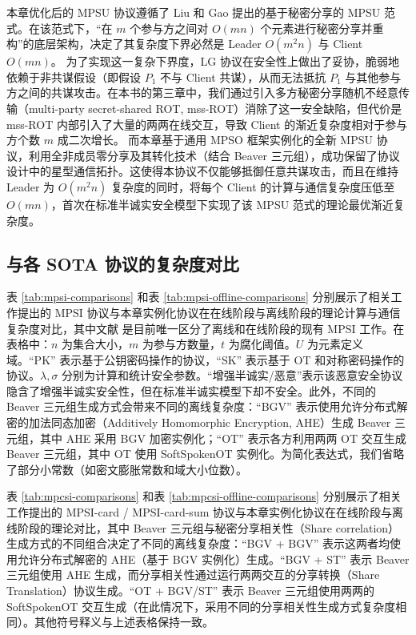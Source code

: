 本章优化后的 MPSU 协议遵循了 Liu 和 Gao \cite{LG-ASIACRYPT-2023} 提出的基于秘密分享的 MPSU 范式。在该范式下，“在 $m$ 个参与方之间对 $O(mn)$ 个元素进行秘密分享并重构”的底层架构，决定了其复杂度下界必然是 Leader $O(m^2 n)$ 与 Client $O(m n)$。
为了实现这一复杂下界度，LG 协议在安全性上做出了妥协，脆弱地依赖于非共谋假设（即假设 $P_1$ 不与 Client 共谋），从而无法抵抗 $P_1$ 与其他参与方之间的共谋攻击。在本书的第三章中，我们通过引入多方秘密分享随机不经意传输（multi-party secret-shared ROT, mss-ROT）消除了这一安全缺陷，但代价是 mss-ROT 内部引入了大量的两两在线交互，导致 Client 的渐近复杂度相对于参与方个数 $m$ 成二次增长。
而本章基于通用 MPSO 框架实例化的全新 MPSU 协议，利用全非成员零分享及其转化技术（结合 Beaver 三元组），成功保留了协议设计中的星型通信拓扑。这使得本协议不仅能够抵御任意共谋攻击，而且在维持 Leader 为 $O(m^2 n)$ 复杂度的同时，将每个 Client 的计算与通信复杂度压低至 $O(mn)$，首次在标准半诚实安全模型下实现了该 MPSU 范式的理论最优渐近复杂度。

\subsection{与各 SOTA 协议的复杂度对比}

表 \ref{tab:mpsi-comparisons} 和表 \ref{tab:mpsi-offline-comparisons} 分别展示了相关工作提出的 MPSI 协议与本章实例化协议在在线阶段与离线阶段的理论计算与通信复杂度对比，其中文献 \cite{BNOP-AsiaCCS-2022} 是目前唯一区分了离线和在线阶段的现有 MPSI 工作。在表格中：$n$ 为集合大小，$m$ 为参与方数量，$t$ 为腐化阈值。$U$ 为元素定义域。``PK'' 表示基于公钥密码操作的协议，``SK'' 表示基于 OT 和对称密码操作的协议。$\lambda, \sigma$ 分别为计算和统计安全参数。``增强半诚实/恶意''表示该恶意安全协议隐含了增强半诚实安全性，但在标准半诚实模型下却不安全。此外，不同的 Beaver 三元组生成方式会带来不同的离线复杂度：``BGV'' 表示使用允许分布式解密的加法同态加密（Additively Homomorphic Encryption, AHE）生成 Beaver 三元组，其中 AHE 采用 BGV 加密实例化；``OT'' 表示各方利用两两 OT 交互生成 Beaver 三元组，其中 OT 使用 SoftSpokenOT 实例化。为简化表达式，我们省略了部分小常数（如密文膨胀常数和域大小位数）。

表 \ref{tab:mpcsi-comparisons} 和表 \ref{tab:mpcsi-offline-comparisons} 分别展示了相关工作提出的 MPSI-card / MPSI-card-sum 协议与本章实例化协议在在线阶段与离线阶段的理论对比，其中 Beaver 三元组与秘密分享相关性（Share correlation）生成方式的不同组合决定了不同的离线复杂度：``BGV + BGV'' 表示这两者均使用允许分布式解密的 AHE（基于 BGV 实例化）生成。``BGV + ST'' 表示 Beaver 三元组使用 AHE 生成，而分享相关性通过运行两两交互的分享转换（Share Translation）协议生成。``OT + BGV/ST'' 表示 Beaver 三元组使用两两的 SoftSpokenOT 交互生成（在此情况下，采用不同的分享相关性生成方式复杂度相同）。其他符号释义与上述表格保持一致。

